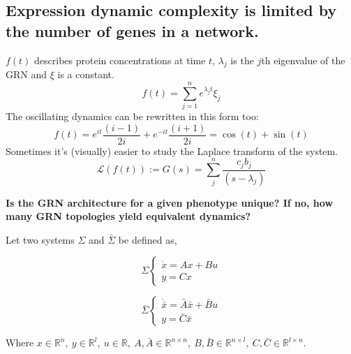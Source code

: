 \documentclass{seminar}
\begin{document}
  \begin{slide}
    \section*{Expression dynamic complexity is limited by the number of genes in a network.}
    $f(t)$ describes protein concentrations at time $t$, $\lambda_{j}$ is the $j$th eigenvalue of the GRN and $\xi$ is a constant. 
      \begin{equation*}
        f(t) = \sum_{j=1}^{n} e^{\lambda_{j}t} \xi_{j}
      \end{equation*}
      The oscillating dynamics can be rewritten in this form too:
      \begin{equation*}
        f(t) = e^{it}\frac{(i-1)}{2i} + e^{-it}\frac{(i+1)}{2i} = \cos(t) + \sin(t)
      \end{equation*}
      Sometimes it's (visually) easier to study the Laplace transform of the system. 
      \begin{equation*}
        \mathcal{L}(f(t)) := G(s) = \sum_{j}^{n} \frac{c_{j} b_{j}}{(s- \lambda_{j})}
      \end{equation*}

  \end{slide}

  \begin{slide}
    \textbf{Is the GRN architecture for a given phenotype unique? If no, how many GRN topologies yield equivalent dynamics?}
    
    Let two systems $\Sigma$ and $\bar{\Sigma}$ be defined as,
    \begin{multicols}{2}
\begin{equation*}
    \Sigma  
    \left \{ 
      \begin{array}{ll}
        \dot{x} = Ax + Bu \\
        y = Cx
      \end{array}
      \right.
\end{equation*}

  \begin{equation*}
  \bar{\Sigma}
    \left \{ 
      \begin{array}{ll}
        \dot{\bar{x}} = \bar{A}\bar{x} + \bar{B}u \\
        y = \bar{C}\bar{x}
      \end{array}
      \right. 
\end{equation*}
\end{multicols}

    Where $x \in \mathbb{R}^{n}, \ y \in \mathbb{R}^{l}, \ u \in \mathbb{R}, \ A, \bar{A} \in \mathbb{R}^{n \times n}, \ B, \bar{B} \in \mathbb{R}^{n \times l}, \ C, \bar{C} \in \mathbb{R}^{l \times n}$. 
  \end{slide}
\end{document}
